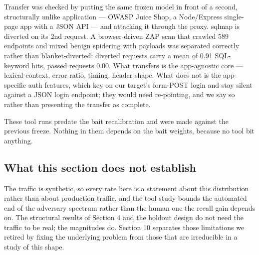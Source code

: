 Transfer was checked by putting the same frozen model in front of a second,
structurally unlike application --- OWASP Juice Shop, a Node/Express single-page app
with a JSON API --- and attacking it through the proxy. sqlmap is diverted on its 2nd
request. A browser-driven ZAP scan that crawled 589 endpoints and mixed benign
spidering with payloads was separated correctly rather than blanket-diverted:
diverted requests carry a mean of 0.91 SQL-keyword hits, passed requests 0.00. What
transfers is the app-agnostic core --- lexical context, error ratio, timing, header
shape. What does not is the app-specific auth features, which key on our target's
form-POST login and stay silent against a JSON login endpoint; they would need
re-pointing, and we say so rather than presenting the transfer as complete.

These tool runs predate the bait recalibration and were made against the previous
freeze. Nothing in them depends on the bait weights, because no tool bit anything.


\subsection{What this section does not establish}

The traffic is synthetic, so every rate here is a statement about this distribution
rather than about production traffic, and the tool study bounds the automated end of
the adversary spectrum rather than the human one the recall gain depends on. The
structural results of Section 4 and the holdout design do not need the traffic to be
real; the magnitudes do. Section 10 separates those limitations we retired by fixing
the underlying problem from those that are irreducible in a study of this shape.
